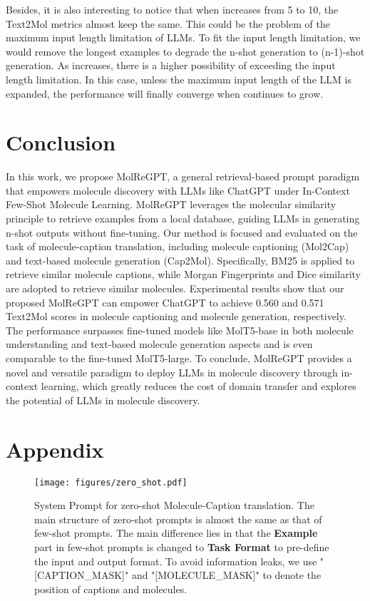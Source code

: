 \documentclass{article}
\theoremstyle{plain}
\theoremstyle{definition}
\theoremstyle{remark}
\begin{document}
Besides, it is also interesting to notice that when  increases from 5 to 10, the Text2Mol metrics almost keep the same.
This could be the problem of the maximum input length limitation of LLMs. To fit the input length limitation, we would remove the longest examples to degrade the n-shot generation to (n-1)-shot generation. As  increases, there is a higher possibility of exceeding the input length limitation. In this case, unless the maximum input length of the LLM is expanded, the performance will finally converge when  continues to grow.




 
\section{Conclusion}
\label{sec:conclusion}
In this work, we propose MolReGPT, a general retrieval-based prompt paradigm that empowers molecule discovery with LLMs like ChatGPT under In-Context Few-Shot Molecule Learning. MolReGPT leverages the molecular similarity principle to retrieve examples from a local database, guiding LLMs in generating n-shot outputs without fine-tuning. Our method is focused and evaluated on the task of molecule-caption translation, including molecule captioning (Mol2Cap) and text-based molecule generation (Cap2Mol). Specifically, BM25 is applied to retrieve similar molecule captions, while Morgan Fingerprints and Dice similarity are adopted to retrieve similar molecules. 
Experimental results show that our proposed MolReGPT can empower ChatGPT to achieve 0.560 and 0.571 Text2Mol scores in molecule captioning and molecule generation, respectively.
The performance surpasses fine-tuned models like MolT5-base in both molecule understanding and text-based molecule generation aspects and is even comparable to the fine-tuned MolT5-large.
To conclude, MolReGPT provides a novel and versatile paradigm to deploy LLMs in molecule discovery through in-context learning, which greatly reduces the cost of domain transfer and explores the potential of LLMs in molecule discovery. 




\newpage
\appendix
\onecolumn
\section{Appendix}

\begin{figure*}[htbp]
\centering
   \texttt{[image: figures/zero\_shot.pdf]}
    \caption{System Prompt for zero-shot Molecule-Caption translation.  The main structure of zero-shot prompts is almost the same as that of few-shot prompts. The main difference lies in that the \textbf{Example} part in few-shot prompts is changed to \textbf{Task Format} to pre-define the input and output format. To avoid information leaks, we use "[CAPTION\_MASK]" and "[MOLECULE\_MASK]" to denote the position of captions and molecules.}
   \label{fig:zero_shot}
\end{figure*}
\end{document}
